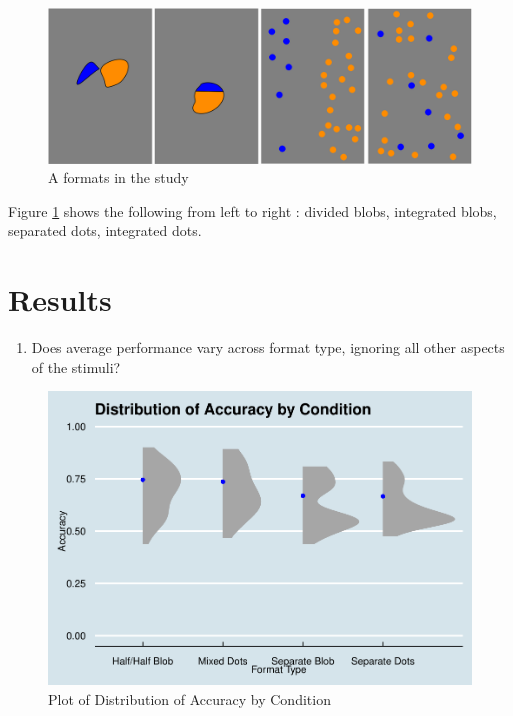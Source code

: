 \documentclass[
  man,floatsintext]{apa6}
\providecommand{\tightlist}{%
  \setlength{\itemsep}{0pt}\setlength{\parskip}{0pt}}
\begin{document}
\begin{figure}[H]

{\centering \includegraphics[width=1\linewidth]{img11/Probtask_formats} 

}

\caption{A formats in the study}\label{fig:img2}
\end{figure}

Figure \ref{fig:img2} shows the following from left to right : divided blobs, integrated blobs, separated dots, integrated dots.
\newpage

\section{Results}\label{results}

\begin{enumerate}
\def\labelenumi{\arabic{enumi}.}
\tightlist
\item
  Does average performance vary across format type, ignoring all other aspects of the stimuli?
\end{enumerate}

\begin{figure}[H]

{\centering \includegraphics[width=0.7\linewidth]{Chin_WA11_files/figure-latex/returnplot-1} 

}

\caption{Plot of Distribution of Accuracy by Condition}\label{fig:returnplot}
\end{figure}
\end{document}
